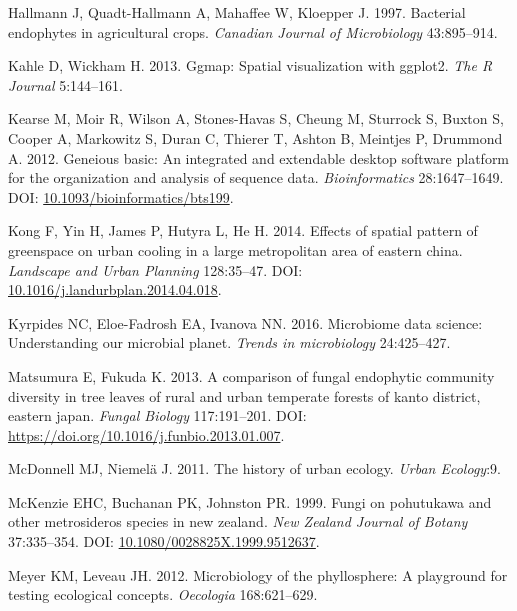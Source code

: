 \documentclass[fleqn,10pt,lineno]{wlpeerj} %
\newlength{\cslhangindent}
\newenvironment{CSLReferences}[2] %
 {%
  \setlength{\parindent}{0pt}
  \ifodd #1 \everypar{\setlength{\hangindent}{\cslhangindent}}\ignorespaces\fi
  \ifnum #2 > 0
  \setlength{\parskip}{#2\baselineskip}
  \fi
 }%
 {}
\begin{document}
\begin{CSLReferences}{1}{0}
\leavevmode{}%
Hallmann J, Quadt-Hallmann A, Mahaffee W, Kloepper J. 1997. Bacterial endophytes in agricultural crops. \emph{Canadian Journal of Microbiology} 43:895--914.

\leavevmode{}%
Kahle D, Wickham H. 2013. Ggmap: Spatial visualization with ggplot2. \emph{The R Journal} 5:144--161.

\leavevmode{}%
Kearse M, Moir R, Wilson A, Stones-Havas S, Cheung M, Sturrock S, Buxton S, Cooper A, Markowitz S, Duran C, Thierer T, Ashton B, Meintjes P, Drummond A. 2012. Geneious basic: An integrated and extendable desktop software platform for the organization and analysis of sequence data. \emph{Bioinformatics} 28:1647--1649. DOI: \href{https://doi.org/10.1093/bioinformatics/bts199}{10.1093/bioinformatics/bts199}.

\leavevmode{}%
Kong F, Yin H, James P, Hutyra L, He H. 2014. Effects of spatial pattern of greenspace on urban cooling in a large metropolitan area of eastern china. \emph{Landscape and Urban Planning} 128:35--47. DOI: \href{https://doi.org/10.1016/j.landurbplan.2014.04.018}{10.1016/j.landurbplan.2014.04.018}.

\leavevmode{}%
Kyrpides NC, Eloe-Fadrosh EA, Ivanova NN. 2016. Microbiome data science: Understanding our microbial planet. \emph{Trends in microbiology} 24:425--427.

\leavevmode{}%
Matsumura E, Fukuda K. 2013. A comparison of fungal endophytic community diversity in tree leaves of rural and urban temperate forests of kanto district, eastern japan. \emph{Fungal Biology} 117:191--201. DOI: \url{https://doi.org/10.1016/j.funbio.2013.01.007}.

\leavevmode{}%
McDonnell MJ, Niemelä J. 2011. The history of urban ecology. \emph{Urban Ecology}:9.

\leavevmode{}%
McKenzie EHC, Buchanan PK, Johnston PR. 1999. Fungi on pohutukawa and other metrosideros species in new zealand. \emph{New Zealand Journal of Botany} 37:335--354. DOI: \href{https://doi.org/10.1080/0028825X.1999.9512637}{10.1080/0028825X.1999.9512637}.

\leavevmode{}%
Meyer KM, Leveau JH. 2012. Microbiology of the phyllosphere: A playground for testing ecological concepts. \emph{Oecologia} 168:621--629.


\end{CSLReferences}
\end{document}
